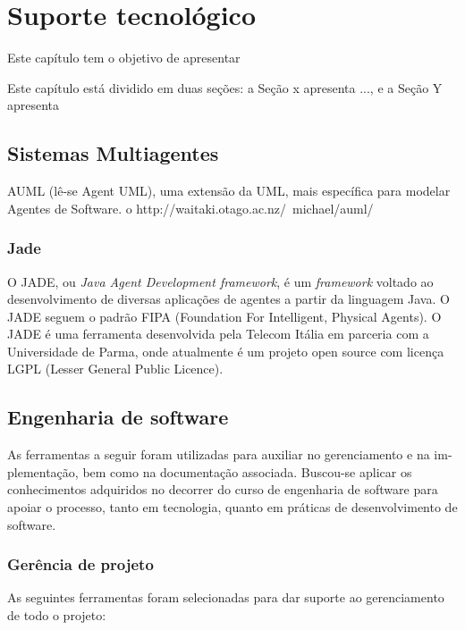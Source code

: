 \chapter[Suporte tecnológico]{Suporte tecnológico}\label{ch:suporte}

Este capítulo tem o objetivo de apresentar 

Este capítulo está dividido em duas seções: a Seção x apresenta ..., e a Seção Y apresenta 

\section{Sistemas Multiagentes}



AUML (lê-se Agent UML), uma extensão da UML,
mais específica para modelar Agentes de Software.
o http://waitaki.otago.ac.nz/~michael/auml/

\subsection{Jade}

O JADE, ou \textit{Java Agent Development framework}, é um \textit{framework} voltado ao desenvolvimento de diversas aplicações de agentes a partir da linguagem Java. O JADE seguem o padrão FIPA (Foundation For Intelligent, Physical Agents). O JADE é uma ferramenta desenvolvida pela Telecom Itália em parceria com a Universidade de Parma, onde atualmente é um projeto open source com licença LGPL (Lesser General Public Licence).



\section{Engenharia de software}


As ferramentas a seguir foram utilizadas para auxiliar no gerenciamento e na im-
plementação, bem como na documentação associada. Buscou-se aplicar os conhecimentos
adquiridos no decorrer do curso de engenharia de software para apoiar o processo, tanto
em tecnologia, quanto em práticas de desenvolvimento de software.

\subsection{Gerência de projeto}
As seguintes ferramentas foram selecionadas para dar suporte ao gerenciamento de todo o projeto:

